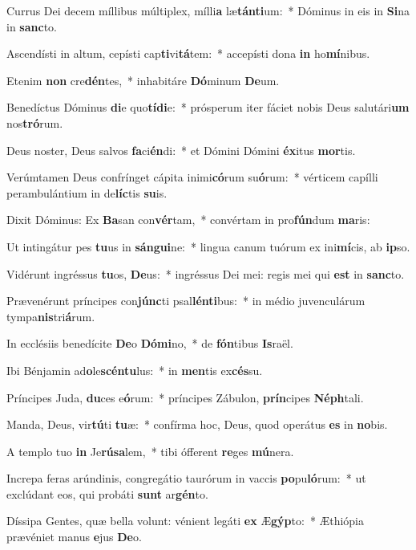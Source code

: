 \item Currus Dei decem míllibus múltiplex, mílli\textbf{a} læ\textbf{tán}\textbf{ti}um:~* Dóminus in eis in \textbf{Si}na in \textbf{sanc}to.
\item Ascendísti in altum, cepísti cap\textbf{ti}vi\textbf{tá}tem:~* accepísti dona \textbf{in} ho\textbf{mí}nibus.
\item Etenim \textbf{non} cre\textbf{dén}tes,~* inhabitáre \textbf{Dó}minum \textbf{De}um.
\item Benedíctus Dóminus \textbf{di}e quo\textbf{tí}\textbf{di}e:~* prósperum iter fáciet nobis Deus salutári\textbf{um} nos\textbf{tró}rum.
\item Deus noster, Deus salvos \textbf{fa}ci\textbf{én}di:~* et Dómini Dómini \textbf{éx}itus \textbf{mor}tis.
\item Verúmtamen Deus confrínget cápita inimi\textbf{có}rum su\textbf{ó}rum:~* vérticem capílli perambulántium in de\textbf{líc}tis \textbf{su}is.
\item Dixit Dóminus: Ex \textbf{Ba}san con\textbf{vér}tam,~* convértam in pro\textbf{fún}dum \textbf{ma}ris:
\item Ut intingátur pes \textbf{tu}us in \textbf{sán}\textbf{gui}ne:~* lingua canum tuórum ex ini\textbf{mí}cis, ab \textbf{ip}so.
\item Vidérunt ingréssus \textbf{tu}os, \textbf{De}us:~* ingréssus Dei mei: regis mei qui \textbf{est} in \textbf{sanc}to.
\item Prævenérunt príncipes con\textbf{júnc}ti psal\textbf{lén}\textbf{ti}bus:~* in médio juvenculárum tympa\textbf{nis}tri\textbf{á}rum.
\item In ecclésiis benedícite \textbf{De}o \textbf{Dó}\textbf{mi}no,~* de \textbf{fón}tibus \textbf{Is}raël.
\item Ibi Bénjamin ad\textbf{o}le\textbf{scén}\textbf{tu}lus:~* in \textbf{men}tis ex\textbf{cés}su.
\item Príncipes Juda, \textbf{du}ces e\textbf{ó}rum:~* príncipes Zábulon, \textbf{prín}cipes \textbf{Néph}tali.
\item Manda, Deus, vir\textbf{tú}ti \textbf{tu}æ:~* confírma hoc, Deus, quod operátus \textbf{es} in \textbf{no}bis.
\item A templo tuo \textbf{in} Je\textbf{rú}\textbf{sa}lem,~* tibi ófferent \textbf{re}ges \textbf{mú}nera.
\item Increpa feras arúndinis, congregátio taurórum in vaccis \textbf{po}pu\textbf{ló}rum:~* ut exclúdant eos, qui probáti \textbf{sunt} ar\textbf{gén}to.
\item Díssipa Gentes, quæ bella volunt: vénient legáti \textbf{ex} Æ\textbf{gýp}to:~* Æthiópia prævéniet manus \textbf{e}jus \textbf{De}o.
